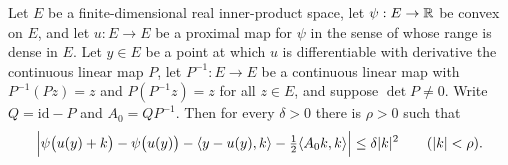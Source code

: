 \begin{lemma}
Let $E$ be a finite-dimensional real inner-product space, let $\psi:E\to\mathbb{R}$ be
convex on $E$, and let $u:E\to E$ be a proximal map for $\psi$ in the sense of
 whose range is dense in $E$. Let $y\in E$ be a point at
which $u$ is differentiable with derivative the continuous linear map $P$, let
$P^{-1}:E\to E$ be a continuous linear map with $P^{-1}(Pz)=z$ and $P(P^{-1}z)=z$
for all $z\in E$, and suppose $\det P\ne0$. Write $Q=\mathrm{id}-P$ and
$A_0=QP^{-1}$. Then for every $\delta>0$ there is $\rho>0$ such that
\[
  \Bigl|\psi\bigl(u(y)+k\bigr)-\psi\bigl(u(y)\bigr)-\langle y-u(y),k\rangle
    -\tfrac12\langle A_0k,k\rangle\Bigr|\le\delta|k|^2\qquad(|k|<\rho).
\]
\end{lemma}
